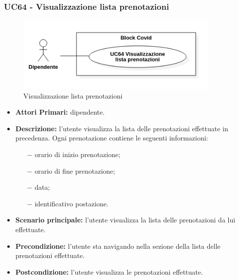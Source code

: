 \subsubsection{ UC64 - Visualizzazione lista prenotazioni}
\begin{figure}[H]
		\centering
		\includegraphics[width=10cm]{res/images/UC64.png}
		\caption{Visualizzazione lista prenotazioni}
		\label{fig:Visualizzazione lista prenotazioni}
	\end{figure}
\begin{itemize}
	\item\textbf{Attori Primari:} dipendente.
	\item\textbf{Descrizione:} l'utente visualizza la lista delle prenotazioni effettuate in precedenza. Ogni prenotazione contiene le seguenti informazioni:
	\begin{itemize}
		\item[$-$] orario di inizio prenotazione;
		\item[$-$] orario di fine prenotazione;
		\item[$-$] data;
		\item[$-$] identificativo postazione.
	\end{itemize}
	\item\textbf{Scenario principale:} l’utente visualizza la lista delle prenotazioni da lui effettuate.
	\item\textbf{Precondizione:} l'utente sta navigando nella sezione della lista delle prenotazioni effettuate.
	\item\textbf{Postcondizione:} l’utente visualizza le prenotazioni effettuate.
\end{itemize}

